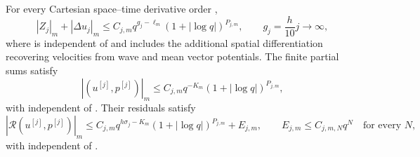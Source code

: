 \begin{lemma}\label{lem:9.8}
For every Cartesian space--time derivative order ,
\begin{equation}
|Z_j|_m+|\Delta u_j|_m
 \le C_{j,m}q^{g_j-\ell_m}(1+|\log q|)^{P_{j,m}},
\qquad
g_j=\frac h{10}j\longrightarrow\infty,
\tag{9.17}\label{eq:9.17}
\end{equation}
where  is independent of  and includes the
additional spatial differentiation recovering velocities from wave and mean vector potentials. The
finite partial sums satisfy
\[
|(u^{[j]},p^{[j]})|_m
 \le C_{j,m}q^{-K_m}(1+|\log q|)^{P_{j,m}},
\]
with  independent of . Their residuals satisfy
\begin{equation}
|\mathscr R(u^{[j]},p^{[j]})|_m
 \le C_{j,m}q^{h\sigma_j-K_m}(1+|\log q|)^{P_{j,m}}+E_{j,m},
\qquad
E_{j,m}\le C_{j,m,N}q^N\quad\text{for every }N,
\tag{9.18}\label{eq:9.18}
\end{equation}
with  independent of .
\end{lemma}

